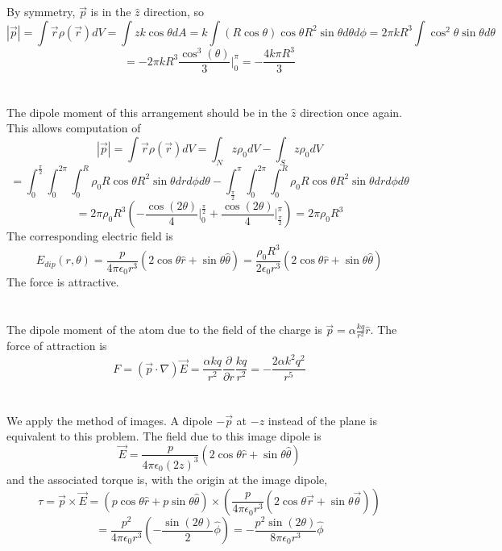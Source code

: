 \documentclass{article}
\begin{document}
\section{}
By symmetry, $\vec{p}$ is in the $\hat{z}$ direction, so
\[|\vec{p}|=\int \vec{r}\rho(\vec{r})dV=\int zk\cos\theta dA=k\int(R\cos\theta)\cos\theta R^2\sin\theta d\theta d\phi=2\pi kR^3\int\cos^2\theta\sin\theta d\theta\]\[=-2\pi kR^3 \frac{\cos^3(\theta)}{3}\bigg|_0^\pi=-\frac{4k\pi R^3}{3}\]


\section{}
The dipole moment of this arrangement should be in the $\hat{z}$ direction once again. This allows computation of
\[|\vec{p}|=\int \vec{r}\rho(\vec{r})dV=\int_N z\rho_0dV - \int_S z \rho_0 dV \]\[=\int_0^{\frac{\pi}{2}}\int_0^{2\pi}\int_0^R\rho_0R\cos\theta R^2\sin\theta drd\phi d\theta-\int_{\frac{\pi}{2}}^\pi\int_0^{2\pi}\int_0^R \rho_0 R\cos\theta R^2\sin\theta drd\phi d\theta\]
\[=2\pi\rho_0R^3\left( -\frac{\cos(2\theta)}{4}\bigg|_0^{\frac{\pi}{2}}+\frac{\cos(2\theta)}{4}\bigg|_{\frac{\pi}{2}}^\pi \right)=2\pi\rho_0R^3\]
The corresponding electric field is
\[E_{dip}(r,\theta)=\frac{p}{4\pi\epsilon_0r^3}(2\cos\theta\hat{r}+\sin\theta\hat{\theta})=\frac{\rho_0R^3}{2\epsilon_0r^3}(2\cos\theta\hat{r}+\sin\theta\hat{\theta})\]
The force is attractive.
\section{}
The dipole moment of the atom due to the field of the charge is $\vec{p}=\alpha\frac{kq}{r^2}\hat{r}$. The force of attraction is
\[F=(\vec{p}\cdot\nabla)\vec{E}=\frac{\alpha kq}{r^2}\frac{\partial }{\partial r}\frac{kq}{r^2}=-\frac{2\alpha k^2q^2}{r^5}\]

\section{}
We apply the method of images. A dipole $-\vec{p}$ at $-z$ instead of the plane is equivalent to this problem. The field due to this image dipole is
\[\vec{E}=\frac{p}{4\pi\epsilon_0(2z)^3}(2\cos\theta\hat{r}+\sin\theta\hat{\theta})\]
and the associated torque is, with the origin at the image dipole,
\[\tau=\vec{p}\times \vec{E}=(p\cos\theta\hat{r} + p\sin\theta\hat{\theta})\times \left(\frac{p}{4\pi\epsilon_0r^3}(2\cos\theta\vec{r}+\sin\theta\vec{\theta})\right)\]
\[=\frac{p^2}{4\pi\epsilon_0r^3}\left(-\frac{\sin(2\theta)}{2}\hat{\phi}\right)=-\frac{p^2\sin(2\theta)}{8\pi\epsilon_0r^3}\hat{\phi}\]
\end{document}
